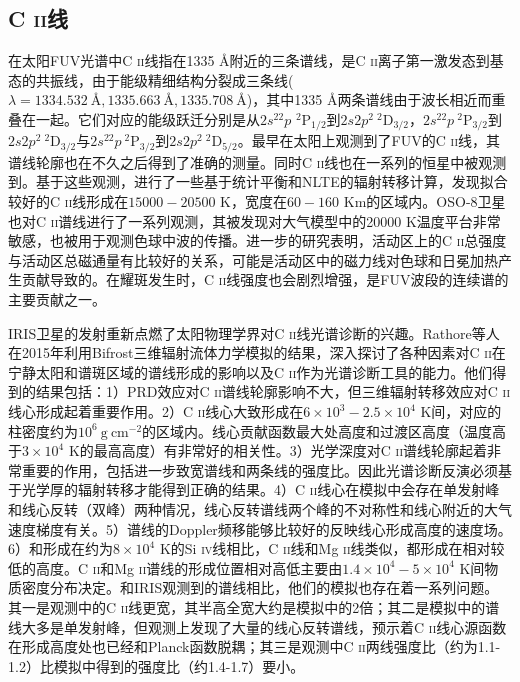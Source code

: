 \subsection{C \textsc{ii}线}
在太阳FUV光谱中C \textsc{ii}线指在1335 \mbox{\AA}附近的三条谱线，是C \textsc{ii}离子第一激发态到基态的共振线，由于能级精细结构分裂成三条线($\lambda = 1334.532~\mbox{\AA}, 1335.663~\mbox{\AA}, 1335.708~\mbox{\AA}$)，其中1335 \mbox{\AA}两条谱线由于波长相近而重叠在一起。它们对应的能级跃迁分别是从$2s^22p$ $^2\mathrm{P}_{1/2}$到$2s2p^2\ ^2\mathrm{D}_{3/2}$，$2s^22p\ ^2\mathrm{P}_{3/2}$到$2s2p^2\ ^2\mathrm{D}_{3/2}$与$2s^22p\ ^2\mathrm{P}_{3/2}$到$2s2p^2\ ^2\mathrm{D}_{5/2}$。\textcites{Detwiler1961}最早在太阳上观测到了FUV的C \textsc{ii}线，其谱线轮廓也在不久之后得到了准确的测量\parencites{Berger1970}。同时C \textsc{ii}线也在一系列的恒星中被观测到\parencites{Freire1979,Praderie1980,Kamp1982}。基于这些观测，\textcites{Berger1970}进行了一些基于统计平衡和NLTE的辐射转移计算，发现拟合较好的C \textsc{ii}线形成在$15000-20500$ K，宽度在$60-160$ Km的区域内。OSO-8卫星也对C \textsc{ii}谱线进行了一系列观测，其被发现对大气模型中的20000 K温度平台非常敏感\parencites{Lites1978}，也被用于观测色球中波的传播\parencites{Chipman1978}。进一步的研究表明，活动区上的C \textsc{ii}总强度与活动区总磁通量有比较好的关系，可能是活动区中的磁力线对色球和日冕加热产生贡献导致的\parencites{Schrijver1987}。在耀斑发生时，C \textsc{ii}线强度也会剧烈增强，是FUV波段的连续谱的主要贡献之一\parencites{Doyle1992,Brekke1996}。

IRIS卫星的发射重新点燃了太阳物理学界对C \textsc{ii}线光谱诊断的兴趣。Rathore等人在2015年利用Bifrost三维辐射流体力学模拟的结果，深入探讨了各种因素对C \textsc{ii}在宁静太阳和谱斑区域的谱线形成的影响以及C \textsc{ii}作为光谱诊断工具的能力\parencites{Rathore2015a,Rathore2015b,Rathore2015c}。他们得到的结果包括：1）PRD效应对C \textsc{ii}谱线轮廓影响不大，但三维辐射转移效应对C \textsc{ii}线心形成起着重要作用。2）C \textsc{ii}线心大致形成在$6\times10^3-2.5\times10^4$ K间，对应的柱密度约为$10^6\ \mathrm{g}\ \mathrm{cm^{-2}}$的区域内。线心贡献函数最大处高度和过渡区高度（温度高于$3\times10^{4}$ K的最高高度）有非常好的相关性。3）光学深度对C \textsc{ii}谱线轮廓起着非常重要的作用，包括进一步致宽谱线和两条线的强度比。因此光谱诊断反演必须基于光学厚的辐射转移才能得到正确的结果。4）C \textsc{ii}线心在模拟中会存在单发射峰和线心反转（双峰）两种情况，线心反转谱线两个峰的不对称性和线心附近的大气速度梯度有关。5）谱线的Doppler频移能够比较好的反映线心形成高度的速度场。6）和形成在约为$8\times10^4$ K的Si \textsc{iv}线相比，C \textsc{ii}线和Mg \textsc{ii}线类似，都形成在相对较低的高度。C \textsc{ii}和Mg \textsc{ii}谱线的形成位置相对高低主要由$1.4\times10^4-5\times10^4$ K间物质密度分布决定。和IRIS观测到的谱线相比，他们的模拟也存在着一系列问题。其一是观测中的C \textsc{ii}线更宽，其半高全宽大约是模拟中的2倍；其二是模拟中的谱线大多是单发射峰，但观测上发现了大量的线心反转谱线，预示着C \textsc{ii}线心源函数在形成高度处也已经和Planck函数脱耦；其三是观测中C \textsc{ii}两线强度比（约为1.1-1.2）比模拟中得到的强度比（约1.4-1.7）要小。

